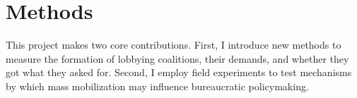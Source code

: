 

\section{Methods}
This project makes two core contributions. First, I introduce new methods to 
measure the formation of lobbying coalitions, their demands, and whether they got what they asked for. 
Second, I employ field experiments to test mechanisms by which mass mobilization may influence bureaucratic policymaking. 

